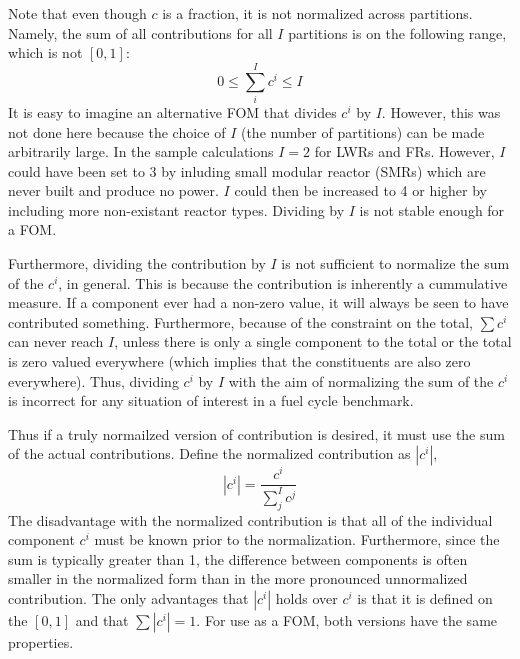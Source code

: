 Note that even though $c$ is a fraction, it is not normalized across 
partitions. Namely, the sum of all contributions for all $I$ partitions
is on the following range, which is not $[0, 1]$:
\begin{equation}
\label{sum-c-range}
0 \le \sum_i^I c^i \le I
\end{equation}
It is easy to imagine an alternative FOM that divides $c^i$ by $I$. However, 
this was not done here because the choice of $I$ (the number of partitions)
can be made arbitrarily large.  In the sample calculations $I=2$ for LWRs and
FRs.  However, $I$ could have been set to 3 by inluding small modular reactor
(SMRs) which are never built and produce no power.  $I$ could then be 
increased to 4 or higher by including more non-existant reactor types.
Dividing by $I$ is not stable enough for a FOM.

Furthermore, dividing the contribution by $I$ is not sufficient to 
normalize the sum of the $c^i$, in general.  This is because the 
contribution is inherently a cummulative measure. If a component ever had a 
non-zero value, it will always be seen to have contributed something. 
Furthermore, because of the constraint on the total, $\sum c^i$ can never
reach $I$, unless there is only a single component to the total or the 
total is zero valued everywhere (which implies that the constituents are also 
zero everywhere). Thus, dividing $c^i$ by $I$ with the aim of normalizing the 
sum of the $c^i$ is incorrect for any situation of interest in a fuel 
cycle benchmark.

Thus if a truly normailzed version of contribution is desired, it must 
use the sum of the actual contributions. Define the normalized contribution 
as $|c^i|$, 
\begin{equation}
\label{norm-ci}
\left|c^i\right| = \frac{c^i}{\sum_j^I c^j}
\end{equation}
The disadvantage with the normalized contribution is that all of the 
individual component $c^i$ must be known prior to the normalization. 
Furthermore, since the sum is typically greater than 1, the difference 
between components is often smaller in the normalized form than in the
more pronounced unnormalized contribution.
The only advantages that $|c^i|$ holds over $c^i$ is that it is defined on 
the $[0,1]$ and that $\sum |c^i| = 1$. For use as a FOM, both versions
have the same properties.

